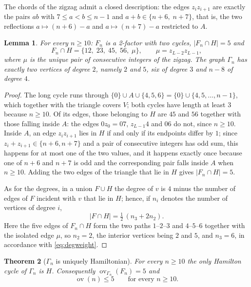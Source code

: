 \documentclass[11pt,a4paper]{article}
\newtheorem{theorem}{Theorem}[section]
\newtheorem{lemma}[theorem]{Lemma}
\theoremstyle{definition}
\theoremstyle{remark}
\newcommand{\ov}{\operatorname{ov}}
\begin{document}
The chords of the zigzag admit a closed description: the edges $z_iz_{i+1}$ are exactly the pairs $ab$ with $7\le a<b\le n-1$ and $a+b\in\{n+6,\;n+7\}$, that is, the two reflections $a\mapsto(n+6)-a$ and $a\mapsto(n+7)-a$ restricted to $A$.

\begin{lemma}\label{lem:gammabasic}
For every $n\ge10$: $F_n$ is a 2-factor with two cycles, $|F_n\cap H|=5$ and
\[
F_n\cap H=\{12,\;23,\;45,\;56,\;\mu\},\qquad \mu=z_{L-2}z_{L-1},
\]
where $\mu$ is the unique pair of consecutive integers of the zigzag. The graph $\Gamma_n$ has exactly two vertices of degree $2$, namely $2$ and $5$, six of degree $3$ and $n-8$ of degree $4$.
\end{lemma}

\begin{proof}
The long cycle runs through $\{0\}\cup A\cup\{4,5,6\}=\{0\}\cup\{4,5,\dots,n-1\}$, which together with the triangle covers $V$; both cycles have length at least $3$ because $n\ge10$. Of its edges, those belonging to $H$ are $45$ and $56$ together with those falling inside $A$: the edges $0z_0=07$, $z_{L-1}4$ and $06$ do not, since $n\ge10$. Inside $A$, an edge $z_iz_{i+1}$ lies in $H$ if and only if its endpoints differ by $1$; since $z_i+z_{i+1}\in\{n+6,n+7\}$ and a pair of consecutive integers has odd sum, this happens for at most one of the two values, and it happens exactly once because one of $n+6$ and $n+7$ is odd and the corresponding pair falls inside $A$ when $n\ge10$. Adding the two edges of the triangle that lie in $H$ gives $|F_n\cap H|=5$.

As for the degrees, in a union $F\cup H$ the degree of $v$ is $4$ minus the number of edges of $F$ incident with $v$ that lie in $H$; hence, if $n_i$ denotes the number of vertices of degree $i$,
\begin{equation}\label{eq:degweight}
|F\cap H|=\tfrac12\,(n_3+2n_2).
\end{equation}
Here the five edges of $F_n\cap H$ form the two paths $1$--$2$--$3$ and $4$--$5$--$6$ together with the isolated edge $\mu$, so $n_2=2$, the interior vertices being $2$ and $5$, and $n_3=6$, in accordance with \eqref{eq:degweight}.
\end{proof}

\begin{theorem}[$\Gamma_n$ is uniquely Hamiltonian]\label{thm:gamma}
For every $n\ge10$ the only Hamilton cycle of $\Gamma_n$ is $H$. Consequently $\ov_{\Gamma_n}(F_n)=5$ and
\[
\ov(n)\le5\qquad\text{for every }n\ge10 .
\]
\end{theorem}
\end{document}
